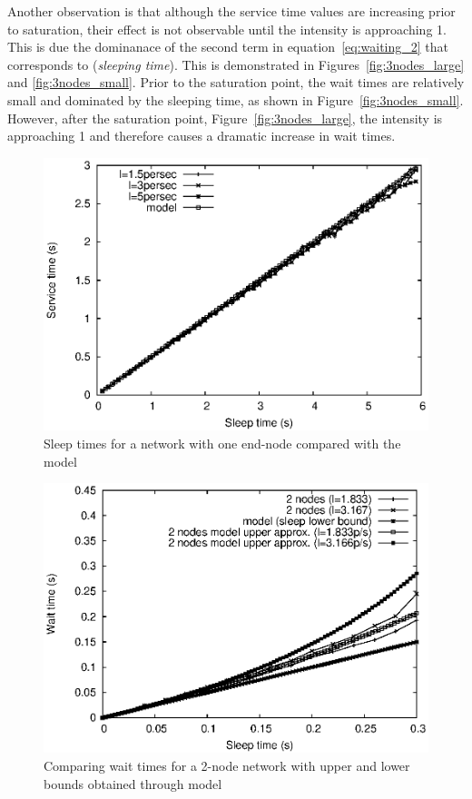 Another observation is that although the service time values are increasing prior to saturation, their effect is not observable until the intensity is approaching 1. This is due the dominanace of the second term in equation~\ref{eq:waiting_2} that corresponds to (\emph{sleeping time}). This is demonstrated in Figures~\ref{fig:3nodes_large} and \ref{fig:3nodes_small}. Prior to the saturation point, the wait times are relatively small and dominated by the sleeping time, as shown in Figure~\ref{fig:3nodes_small}. However, after the saturation point, Figure~\ref{fig:3nodes_large}, the intensity is approaching 1 and therefore causes a dramatic increase in wait times.

\begin{figure}[t]
\centering
\includegraphics[scale=0.65]{figures/1node_varySleep_sim.eps}
\caption{Sleep times for a network with one end-node compared with the model}
\label{fig:1node}
\end{figure}

\begin{figure}[t]
\centering
\includegraphics[scale=0.65]{figures/sleep_model_2nodes.eps}
\caption{Comparing wait times for a 2-node network with upper and lower bounds obtained through model}
\label{fig:wait_times_2nodes}
\end{figure}


